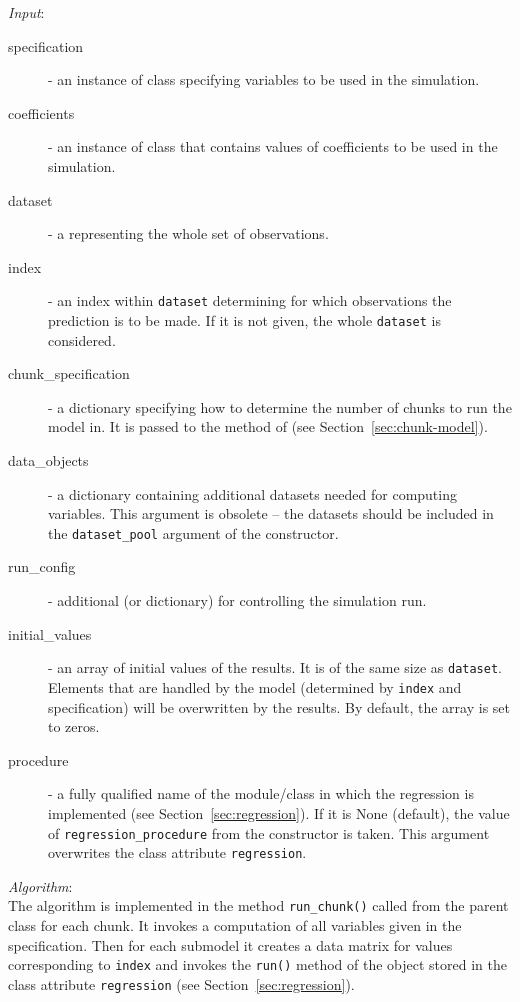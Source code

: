 {\it Input}:
\begin{description}
\item[specification] - an instance of class 
  specifying variables to be used in the simulation.
\item[coefficients] - an instance of class  that contains
  values of coefficients to be used in the simulation.
\item[dataset] - a  representing the whole set of observations.
\item[index] - an index within \verb|dataset| determining for which
  observations the prediction is to be made. If it is not given, the whole
  \verb|dataset| is considered.
\item[chunk_specification] - a dictionary specifying how to determine the number
  of chunks to run the model in. It is  passed to the  method of 
   (see Section~\ref{sec:chunk-model}).
\item[data_objects] - a dictionary containing additional datasets 
  needed for computing variables. This argument is obsolete -- the datasets should be 
  included in the \verb|dataset_pool| argument of the constructor.
\item[run_config] - additional  (or dictionary) for controlling the simulation
  run.
\item[initial_values] - an array of initial values of the results. It is of the same size as 
  \verb|dataset|. Elements that are handled by the model (determined by \verb|index| and specification)
  will be overwritten by the results. By default, the array is set to zeros.
\item[procedure] - a fully qualified name of the module/class in
  which the regression is implemented (see Section~\ref{sec:regression}). 
  If it is None (default), the value of \verb|regression_procedure| from the constructor is taken. 
  This argument overwrites the class attribute \verb|regression|.

\end{description}

{\it Algorithm}:~\\[1mm]
The algorithm is implemented in the method \verb|run_chunk()| called from the
parent class  for each chunk. It invokes a computation of
all variables given in the specification. Then for each submodel it creates a
data matrix for values corresponding to \verb|index| and invokes the
\verb|run()| method of the object stored in the class attribute
\verb|regression| (see Section~\ref{sec:regression}).

